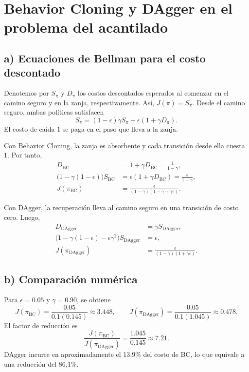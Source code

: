 \section{Behavior Cloning y DAgger en el problema del acantilado}

\subsection*{a) Ecuaciones de Bellman para el costo descontado}

Denotemos por $S_\pi$ y $D_\pi$ los costos descontados esperados al
comenzar en el camino seguro y en la zanja, respectivamente. Así,
$J(\pi)=S_\pi$. Desde el camino seguro, ambas políticas satisfacen
\[
    S_\pi=(1-\epsilon)\gamma S_\pi
          +\epsilon(1+\gamma D_\pi).
\]
El costo de caída $1$ se paga en el paso que lleva a la zanja.

Con Behavior Cloning, la zanja es absorbente y cada transición desde
ella cuesta $1$. Por tanto,
\begin{align*}
    D_{\mathrm{BC}} &= 1+\gamma D_{\mathrm{BC}}
        =\frac{1}{1-\gamma}, \\
    \bigl(1-\gamma(1-\epsilon)\bigr)S_{\mathrm{BC}}
        &=\epsilon(1+\gamma D_{\mathrm{BC}})
        =\frac{\epsilon}{1-\gamma}, \\
    J(\pi_{\mathrm{BC}})&=
        \boxed{\frac{\epsilon}{(1-\gamma)(1-\gamma+\gamma\epsilon)}}.
\end{align*}

Con DAgger, la recuperación lleva al camino seguro en una transición
de costo cero. Luego,
\begin{align*}
    D_{\mathrm{DAgger}} &= \gamma S_{\mathrm{DAgger}}, \\
    \bigl(1-\gamma(1-\epsilon)-\epsilon\gamma^2\bigr)S_{\mathrm{DAgger}}
        &=\epsilon, \\
    J(\pi_{\mathrm{DAgger}})&=
        \boxed{\frac{\epsilon}{(1-\gamma)(1+\gamma\epsilon)}}.
\end{align*}

\subsection*{b) Comparación numérica}

Para $\epsilon=0.05$ y $\gamma=0.90$, se obtiene
\[
    J(\pi_{\mathrm{BC}})=\frac{0.05}{0.1(0.145)}\approx 3.448,
    \qquad
    J(\pi_{\mathrm{DAgger}})=\frac{0.05}{0.1(1.045)}\approx 0.478.
\]
El factor de reducción es
\[
    \frac{J(\pi_{\mathrm{BC}})}{J(\pi_{\mathrm{DAgger}})}
    =\frac{1.045}{0.145}\approx\boxed{7.21}.
\]
DAgger incurre en aproximadamente el 13,9\% del costo de BC,
lo que equivale a una reducción del 86,1\%.

